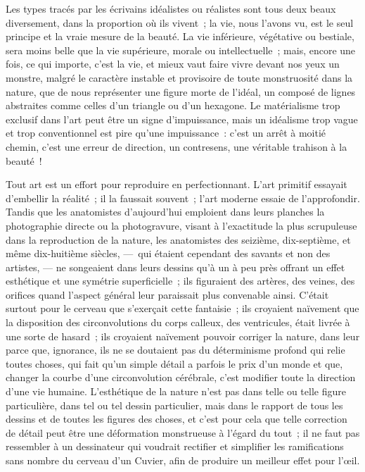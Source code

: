 \documentclass[french,twoside]{book} %
\begin{document}
\noindent Les types tracés par les écrivains idéalistes ou réalistes sont tous deux beaux diversement, dans la proportion où ils vivent ; la vie, nous l’avons vu, est le seul principe et la vraie mesure de la beauté. La vie inférieure, végétative ou bestiale, sera moins belle que la vie supérieure, morale ou intellectuelle ; mais, encore une fois, ce qui importe, c’est la vie, et mieux vaut faire vivre devant nos yeux un monstre, malgré le caractère instable et provisoire de toute monstruosité dans la nature, que de nous représenter une figure morte de l’idéal, un composé de lignes abstraites comme celles d’un triangle ou d’un hexagone. Le matérialisme trop exclusif dans l’art peut être un signe d’impuissance, mais un idéalisme trop vague et trop conventionnel est pire qu’une impuissance : c’est un arrêt à moitié chemin, c’est une erreur de direction, un contresens, une véritable trahison à la beauté !\par
Tout art est un effort pour reproduire en perfectionnant. L’art primitif essayait d’embellir la réalité ; il la faussait souvent ; l’art moderne essaie de l’approfondir. Tandis que les anatomistes d’aujourd’hui emploient dans leurs planches la photographie directe ou la photogravure, visant à l’exactitude la plus scrupuleuse dans la reproduction de la nature, les anatomistes des seizième, dix-septième, et même dix-huitième siècles, — qui étaient cependant des savants et non des artistes, — ne songeaient dans leurs dessins qu’à un à peu près offrant un effet esthétique et une symétrie superficielle ; ils figuraient des artères, des veines, des orifices quand l’aspect général leur paraissait plus convenable ainsi. C’était surtout pour le cerveau que s’exerçait cette fantaisie ; ils croyaient naïvement que la disposition des circonvolutions du corps calleux, des ventricules, était livrée à une sorte de hasard ; ils croyaient naïvement pouvoir corriger la nature, dans leur parce que, ignorance, ils ne se doutaient pas du déterminisme profond qui relie toutes choses, qui fait qu’un simple détail a parfois le prix d’un monde et que, changer la courbe d’une circonvolution cérébrale, c’est modifier toute la direction d’une vie humaine. L’esthétique de la nature n’est pas dans telle ou telle figure particulière, dans tel ou tel dessin particulier, mais dans le rapport de tous les dessins et de toutes les figures des choses, et c’est pour cela que telle correction de détail peut être une déformation monstrueuse à l’égard du tout ; il ne faut pas ressembler à un dessinateur qui voudrait rectifier et simplifier les ramifications sans nombre du cerveau d’un Cuvier, afin de produire un meilleur effet pour l’œil.\par
\end{document}
